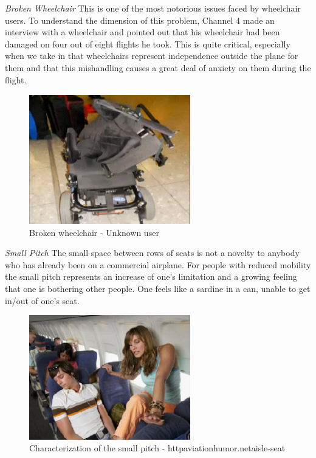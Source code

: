 \emph{Broken Wheelchair} This is one of the most notorious issues faced by wheelchair users. To understand the dimension of this problem, Channel 4 made an interview with a wheelchair and pointed out that his wheelchair had been damaged on four out of eight flights he took. This is quite critical, especially when we take in that wheelchairs represent independence outside the plane for them and that this mishandling causes a great deal of anxiety on them during the flight.  \\
 
\begin{figure}[h]
\centering
\includegraphics[width=7cm]{brazil_images/image001.png}
\caption{Broken wheelchair - Unknown user}
\label{fig:broken_wheelchair}
\end{figure}


\emph{Small Pitch} The small space between rows of seats is not a novelty to anybody who has already been on a commercial airplane. For people with reduced mobility the small pitch represents an increase of one’s limitation and a growing feeling that one is bothering other people. One feels like a sardine in a can, unable to get in/out of one’s seat. \\

\begin{figure}[h]
\centering
\includegraphics[width=7cm]{brazil_images/image002.png}
\caption{Characterization of the small pitch - httpaviationhumor.netaisle-seat}
\label{fig:broken_wheelchair}
\end{figure}


